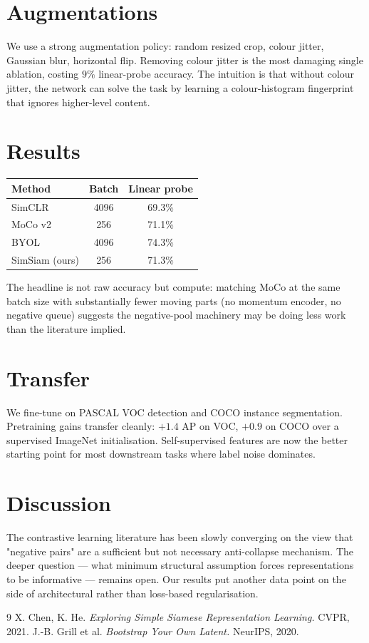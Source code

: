 \documentclass[11pt]{article}
\begin{document}
\section{Augmentations}
We use a strong augmentation policy: random resized crop, colour jitter,
Gaussian blur, horizontal flip. Removing colour jitter is the most damaging
single ablation, costing $9\%$ linear-probe accuracy. The intuition is that
without colour jitter, the network can solve the task by learning a
colour-histogram fingerprint that ignores higher-level content.

\section{Results}
\begin{tabular}{lcc}
\hline
Method & Batch & Linear probe \\
\hline
SimCLR     & 4096 & 69.3\% \\
MoCo v2    & 256  & 71.1\% \\
BYOL       & 4096 & 74.3\% \\
SimSiam (ours) & 256 & 71.3\% \\
\hline
\end{tabular}

The headline is not raw accuracy but compute: matching MoCo at the same batch
size with substantially fewer moving parts (no momentum encoder, no negative
queue) suggests the negative-pool machinery may be doing less work than the
literature implied.

\section{Transfer}
We fine-tune on PASCAL VOC detection and COCO instance segmentation. Pretraining
gains transfer cleanly: $+1.4$ AP on VOC, $+0.9$ on COCO over a supervised
ImageNet initialisation. Self-supervised features are now the better starting
point for most downstream tasks where label noise dominates.

\section{Discussion}
The contrastive learning literature has been slowly converging on the view
that "negative pairs" are a sufficient but not necessary anti-collapse
mechanism. The deeper question --- what minimum structural assumption forces
representations to be informative --- remains open. Our results put another
data point on the side of architectural rather than loss-based regularisation.


\begin{thebibliography}{9}
 X. Chen, K. He. \emph{Exploring Simple Siamese Representation Learning.} CVPR, 2021.
 J.-B. Grill et al. \emph{Bootstrap Your Own Latent.} NeurIPS, 2020.
\end{thebibliography}
\end{document}

